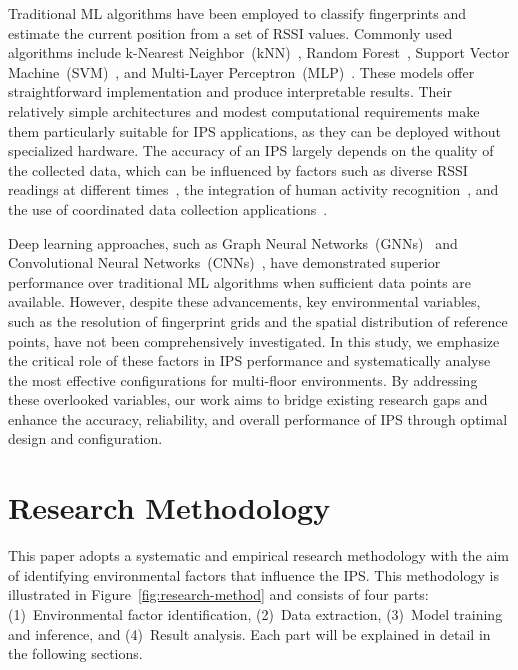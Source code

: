 \documentclass[runningheads]{llncs}
\begin{document}
Traditional ML algorithms have been employed to classify fingerprints and estimate the current position from a set of RSSI values. Commonly used algorithms include k-Nearest Neighbor~(kNN)~\cite{LRE1,LRE2,LRE6}, Random Forest~\cite{LRE1,LRE5,LRE6}, Support Vector Machine~(SVM)~\cite{add1,LRE1,LRE2,LRE6}, and Multi-Layer Perceptron~(MLP)~\cite{LRE1,LRE2}. These models offer straightforward implementation and produce interpretable results. Their relatively simple architectures and modest computational requirements make them particularly suitable for IPS applications, as they can be deployed without specialized hardware. The accuracy of an IPS largely depends on the quality of the collected data, which can be influenced by factors such as diverse RSSI readings at different times~\cite{LRE3}, the integration of human activity recognition~\cite{LRE4}, and the use of coordinated data collection applications~\cite{LRE7}.

Deep learning approaches, such as Graph Neural Networks~(GNNs)~\cite{LRE2} and Convolutional Neural Networks~(CNNs)~\cite{LRE4}, have demonstrated superior performance over traditional ML algorithms when sufficient data points are available. However, despite these advancements, key environmental variables, such as the resolution of fingerprint grids and the spatial distribution of reference points, have not been comprehensively investigated. In this study, we emphasize the critical role of these factors in IPS performance and systematically analyse the most effective configurations for multi-floor environments. By addressing these overlooked variables, our work aims to bridge existing research gaps and enhance the accuracy, reliability, and overall performance of IPS through optimal design and configuration.


\section{Research Methodology}\label{sec:research-method}

This paper adopts a systematic and empirical research methodology with the aim of identifying environmental factors that influence the IPS. This methodology is illustrated in Figure~\ref{fig:research-method} and consists of four parts: (1)~Environmental factor identification, (2)~Data extraction, (3)~Model training and inference, and (4)~Result analysis. Each part will be explained in detail in the following sections.
\end{document}
